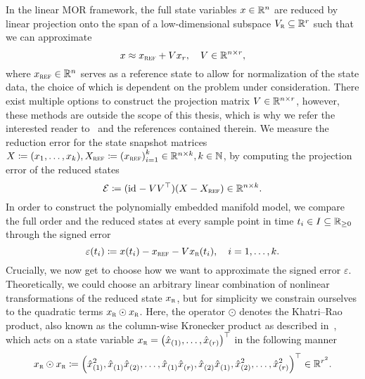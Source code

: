In the linear MOR framework, the full state variables $x \in \mathbb{R}^n$ are reduced by linear projection onto the span of a low-dimensional subspace $V_{\textnormal{\scshape r}} \subseteq \mathbb{R}^r$ such that we can approximate
\begin{equation*}
    x \approx x_{\textnormal{\scshape ref}} + V x_r,\quad V \in \mathbb{R}^{n \times r},
\end{equation*}
where $x_{\textnormal{\scshape ref}} \in \mathbb{R}^n$ serves as a reference state to allow for normalization of the state data, the choice of which is dependent on the problem under consideration.
There exist multiple options to construct the projection matrix $V \in \mathbb{R}^{n \times r}$, however, these methods are outside the scope of this thesis, which is why we refer the interested reader to~\cite{BOP2017, BCO2017} and the references contained therein.
We measure the reduction error for the state snapshot matrices $X \coloneqq (x_1, \dots, x_k), X_{\textnormal{\scshape ref}} \coloneqq {(x_{\textnormal{\scshape ref}})}_{i = 1}^k \in \mathbb{R}^{n \times k},k \in \mathbb{N}$, by computing the projection error of the reduced states
\begin{equation*}
    \mathcal{E} \coloneqq (\text{id}_{} - V V^{\top}) (X - X_{\textnormal{\scshape ref}}) \in \mathbb{R}^{n \times k}.
\end{equation*}
In order to construct the polynomially embedded manifold model, we compare the full order and the reduced states at every sample point in time $t_i \in I \subseteq \mathbb{R}_{\geq 0}$ through the signed error
\begin{equation}\label{eq:linear-signed-error}
    \varepsilon(t_i) \coloneqq x(t_i) - x_{\textnormal{\scshape ref}} - V x_{\textnormal{\scshape r}}(t_i),\quad i = 1, \dots, k.
\end{equation}
Crucially, we now get to choose how we want to approximate the signed error $\varepsilon$.
Theoretically, we could choose an arbitrary linear combination of nonlinear transformations of the reduced state $x_{\textnormal{\scshape r}}$, but for simplicity we constrain ourselves to the quadratic terms $x_{\textnormal{\scshape r}} \odot x_{\textnormal{\scshape r}}$.
Here, the operator $\odot$ denotes the Khatri--Rao product, also known as the column-wise Kronecker product as described in~\cite{Slyusar1999, Shuangzhe2008, Favier2021}, which acts on a state variable $x_{\textnormal{\scshape r}} = {\left( \hat{x}_{(1)}, \dots, \hat{x}_{(r)} \right)}^{\top}$ in the following manner
\begin{equation}\label{eq:redundant-khatri-rao}
    x_{\textnormal{\scshape r}} \odot x_{\textnormal{\scshape r}} \coloneqq {\left( \hat{x}_{(1)}^2, \hat{x}_{(1)}^{\phantom{1}} \hat{x}_{(2)}^{\phantom{1}}, \dots, \hat{x}_{(1)}^{\phantom{1}} \hat{x}_{(r)}^{\phantom{1}}, \hat{x}_{(2)}^{\phantom{1}} \hat{x}_{(1)}^{\phantom{1}}, \hat{x}_{(2)}^2, \dots, \hat{x}_{(r)}^2 \right)}^{\top} \in \mathbb{R}^{r^2}.
\end{equation}
